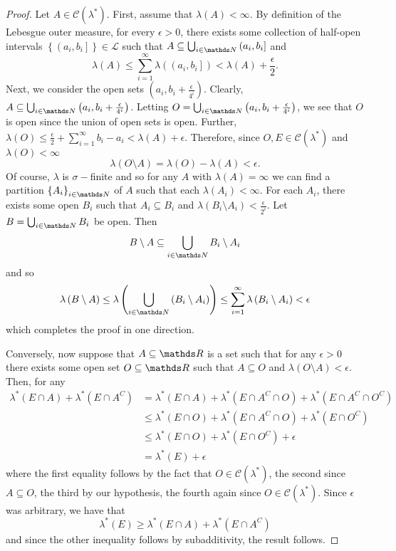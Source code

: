 \begin{proof}
Let $A\in\mathcal{C}\left(\lambda^{*}\right)$. First, assume that
$\lambda\left(A\right)<\infty.$ By definition of the Lebesgue outer
measure, for every $\epsilon>0$, there exists some collection of
half-open intervals $\left\{ \left(a_{i},b_{i}\right]\right\} \in\mathcal{L}$
such that $A\subseteq\bigcup_{i\in\N}\left(a_{i},b_{i}\right]$ and
\[
\lambda\left(A\right)\leq\sum_{i=1}^{\infty}\lambda\left(\left(a_{i},b_{i}\right]\right)<\lambda\left(A\right)+\frac{\epsilon}{2}.
\]
 Next, we consider the open sets $\left(a_{i},b_{i}+\frac{\epsilon}{4^{i}}\right)$.
Clearly, $A\subseteq\bigcup_{i\in\N}\left(a_{i},b_{i}+\frac{\epsilon}{4^{i}}\right)$.
Letting $O=\bigcup_{i\in\N}\left(a_{i},b_{i}+\frac{\epsilon}{4^{i}}\right)$,
we see that $O$ is open since the union of open sets is open. Further,
$\lambda\left(O\right)\leq\frac{\epsilon}{2}+\sum_{i=1}^{\infty}b_{i}-a_{i}<\lambda\left(A\right)+\epsilon$.
Therefore, since $O,E\in\mathcal{C}\left(\lambda^{*}\right)$ and
$\lambda\left(O\right)<\infty$
\[
\lambda\left(O\setminus A\right)=\lambda\left(O\right)-\lambda\left(A\right)<\epsilon.
\]
 Of course, $\lambda$ is $\sigma-$finite and so for any $A$ with
$\lambda\left(A\right)=\infty$ we can find a partition $\left\{ A_{i}\right\} _{i\in\N}$
of $A$ such that each $\lambda\left(A_{i}\right)<\infty$. For each
$A_{i}$, there exists some open $B_{i}$ such that $A_{i}\subseteq B_{i}$
and $\lambda\left(B_{i}\setminus A_{i}\right)<\frac{\epsilon}{2^{i}}$.
Let $B=\bigcup_{i\in\N}B_{i}$ be open. Then
\[
B\setminus A\subseteq\bigcup_{i\in\N}B_{i}\setminus A_{i}
\]
and so 
\[
\lambda\left(B\setminus A\right)\leq\lambda\left(\bigcup_{i\in\N}\left(B_{i}\setminus A_{i}\right)\right)\leq\sum_{i=1}^{\infty}\lambda\left(B_{i}\setminus A_{i}\right)<\epsilon
\]
which completes the proof in one direction.

Conversely, now suppose that $A\subseteq\R$ is a set such that for
any $\epsilon>0$ there exists some open set $O\subseteq\R$ such
that $A\subseteq O$ and $\lambda\left(O\setminus A\right)<\epsilon.$
Then, for any 
\begin{align*}
\lambda^{*}\left(E\cap A\right)+\lambda^{*}\left(E\cap A^{C}\right) & =\lambda^{*}\left(E\cap A\right)+\lambda^{*}\left(E\cap A^{C}\cap O\right)+\lambda^{*}\left(E\cap A^{C}\cap O^{C}\right)\\
 & \leq\lambda^{*}\left(E\cap O\right)+\lambda^{*}\left(E\cap A^{C}\cap O\right)+\lambda^{*}\left(E\cap O^{C}\right)\\
 & \leq\lambda^{*}\left(E\cap O\right)+\lambda^{*}\left(E\cap O^{C}\right)+\epsilon\\
 & =\lambda^{*}\left(E\right)+\epsilon
\end{align*}
where the first equality follows by the fact that $O\in\mathcal{C}\left(\lambda^{*}\right)$,
the second since $A\subseteq O$, the third by our hypothesis, the
fourth again since $O\in\mathcal{C}\left(\lambda^{*}\right)$. Since
$\epsilon$ was arbitrary, we have that
\[
\lambda^{*}\left(E\right)\geq\lambda^{*}\left(E\cap A\right)+\lambda^{*}\left(E\cap A^{C}\right)
\]
and since the other inequality follows by subadditivity, the result
follows.
\end{proof}

